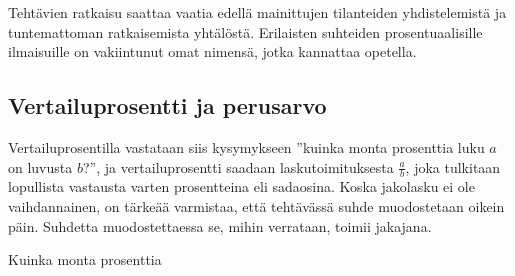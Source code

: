 Tehtävien ratkaisu saattaa vaatia edellä mainittujen tilanteiden yhdistelemistä ja tuntemattoman ratkaisemista yhtälöstä. Erilaisten suhteiden prosentuaalisille ilmaisuille on vakiintunut omat nimensä, jotka kannattaa opetella.

\newpage %
\subsection{Vertailuprosentti ja perusarvo}


Vertailuprosentilla vastataan siis kysymykseen ''kuinka monta prosenttia luku $a$ on luvusta $b$?'', ja vertailuprosentti saadaan laskutoimituksesta $\frac{a}{b}$, joka tulkitaan lopullista vastausta varten prosentteina eli sadaosina. Koska jakolasku ei ole vaihdannainen, on tärkeää varmistaa, että tehtävässä suhde muodostetaan oikein päin. Suhdetta muodostettaessa se, mihin verrataan, toimii jakajana.

\begin{esimerkki}
Kuinka monta prosenttia
	\begin{esimratk}
	\end{esimratk}
\end{esimerkki}



